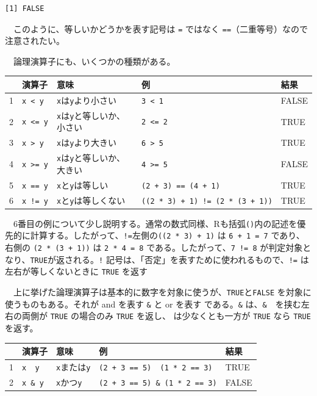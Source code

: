 \documentclass[
  a4paper,
  pandoc,
  ja=standard,
  jafont=haranoaji]{bxjsbook}
\begin{document}
\begin{verbatim}
[1] FALSE
\end{verbatim}

　このように、等しいかどうかを表す記号は \texttt{=} ではなく
\texttt{==}（二重等号）なので注意されたい。

　論理演算子にも、いくつかの種類がある。

\begin{longtable}[]{@{}lllll@{}}
\toprule
& 演算子 & 意味 & 例 & 結果 \\
\midrule
\endhead
1 & \texttt{x\ \textless{}\ y} & \texttt{x}は\texttt{y}より小さい &
\texttt{3\ \textless{}\ 1} & FALSE \\
2 & \texttt{x\ \textless{}=\ y} &
\texttt{x}は\texttt{y}と等しいか、小さい & \texttt{2\ \textless{}=\ 2} &
TRUE \\
3 & \texttt{x\ \textgreater{}\ y} & \texttt{x}は\texttt{y}より大きい &
\texttt{6\ \textgreater{}\ 5} & TRUE \\
4 & \texttt{x\ \textgreater{}=\ y} &
\texttt{x}は\texttt{y}と等しいか、大きい &
\texttt{4\ \textgreater{}=\ 5} & FALSE \\
5 & \texttt{x\ ==\ y} & \texttt{x}と\texttt{y}は等しい &
\texttt{(2\ +\ 3)\ ==\ (4\ +\ 1)} & TRUE \\
6 & \texttt{x\ !=\ y} & \texttt{x}と\texttt{y}は等しくない &
\texttt{((2\ *\ 3)\ +\ 1)\ !=\ (2\ *\ (3\ +\ 1))} & TRUE \\
\bottomrule
\end{longtable}

　6番目の例について少し説明する。通常の数式同様、Rも括弧\texttt{()}内の記述を優先的に計算する。したがって、\texttt{!=}左側の\texttt{((2\ *\ 3)\ +\ 1)}
は \texttt{6\ +\ 1\ =\ 7} であり、右側の \texttt{(2\ *\ (3\ +\ 1))} は
\texttt{2\ *\ 4\ =\ 8} である。したがって、\texttt{7\ !=\ 8}
が判定対象となり、\texttt{TRUE}が返される。\texttt{!}
記号は、「否定」を表すために使われるもので、\texttt{!=}
は左右が等しくないときに \texttt{TRUE} を返す

　上に挙げた論理演算子は基本的に数字を対象に使うが、\texttt{TRUE}と\texttt{FALSE}
を対象に使うものもある。それが and を表す \texttt{\&} と or
を表す\texttt{\textbar{}} である。\texttt{\&}
は、\texttt{\&}　を挟む左右の両側が \texttt{TRUE} の場合のみ
\texttt{TRUE} を返し、\texttt{\textbar{}} は少なくとも一方が
\texttt{TRUE} なら \texttt{TRUE} を返す。

\begin{longtable}[]{@{}lllll@{}}
\toprule
& 演算子 & 意味 & 例 & 結果 \\
\midrule
\endhead
1 & \texttt{x\ \textbar{}\ y} & \texttt{x}または\texttt{y} &
\texttt{(2\ +\ 3\ ==\ 5)\ \textbar{}\ (1\ *\ 2\ ==\ 3)} & TRUE \\
2 & \texttt{x\ \&\ y} & \texttt{x}かつ\texttt{y} &
\texttt{(2\ +\ 3\ ==\ 5)\ \&\ (1\ *\ 2\ ==\ 3)} & FALSE \\
\bottomrule
\end{longtable}
\end{document}
